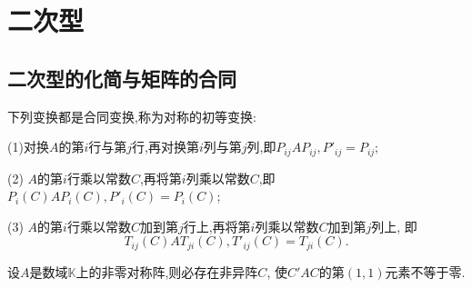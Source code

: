 \section{二次型}

\subsection{二次型的化简与矩阵的合同}

\begin{theory}
  下列变换都是合同变换,称为对称的初等变换:

  (1)对换$A$的第$i$行与第$j$行,再对换第$i$列与第$j$列,即$P_{ij}AP_{ij}, P'_{ij}=P_{ij}$;

  (2) $A$的第$i$行乘以常数$C$,再将第$i$列乘以常数$C$,即$P_i(C)AP_i(C),P'_i(C)=P_i(C)$;

  (3) $A$的第$i$行乘以常数$C$加到第$j$行上,再将第$i$列乘以常数$C$加到第$j$列上,
  即
  \[T_{ij}(C)AT_{ji}(C), T'_{ij}(C)=T_{ji}(C).\]
\end{theory}

\begin{theory}
  设$A$是数域$\mathbb{K}$上的非零对称阵,则必存在非异阵$C$,
  使$C'AC$的第$(1,1)$元素不等于零.
\end{theory}

